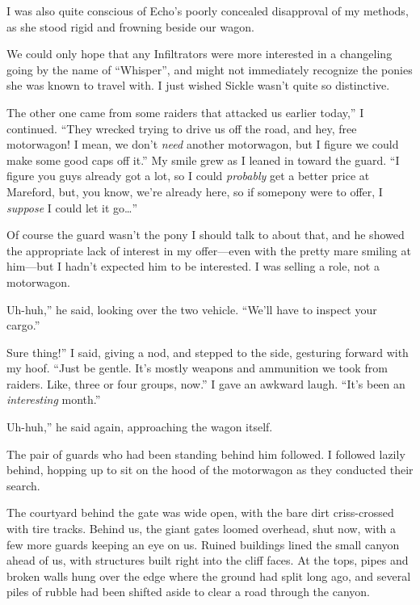 I was also quite conscious of Echo’s poorly concealed disapproval of my methods, as she stood rigid and frowning beside our wagon.

We could only hope that any Infiltrators were more interested in a changeling going by the name of “Whisper”, and might not immediately recognize the ponies she was known to travel with. I just wished Sickle wasn’t quite so distinctive.

\leavevmode{}The other one came from some raiders that attacked us earlier today,” I continued. “They wrecked trying to drive us off the road, and hey, free motorwagon! I mean, we don’t \textit{need} another motorwagon, but I figure we could make some good caps off it.” My smile grew as I leaned in toward the guard. “I figure you guys already got a lot, so I could \textit{probably} get a better price at Mareford, but, you know, we’re already here, so if somepony were to offer, I \textit{suppose} I could let it go…”

Of course the guard wasn’t the pony I should talk to about that, and he showed the appropriate lack of interest in my offer—even with the pretty mare smiling at him—but I hadn’t expected him to be interested. I was selling a role, not a motorwagon.

\leavevmode{}Uh-huh,” he said, looking over the two vehicle. “We’ll have to inspect your cargo.”

\leavevmode{}Sure thing!” I said, giving a nod, and stepped to the side, gesturing forward with my hoof. “Just be gentle. It’s mostly weapons and ammunition we took from raiders. Like, three or four groups, now.” I gave an awkward laugh. “It’s been an \textit{interesting} month.”

\leavevmode{}Uh-huh,” he said again, approaching the wagon itself.

The pair of guards who had been standing behind him followed. I followed lazily behind, hopping up to sit on the hood of the motorwagon as they conducted their search.

The courtyard behind the gate was wide open, with the bare dirt criss-crossed with tire tracks. Behind us, the giant gates loomed overhead, shut now, with a few more guards keeping an eye on us. Ruined buildings lined the small canyon ahead of us, with structures built right into the cliff faces. At the tops, pipes and broken walls hung over the edge where the ground had split long ago, and several piles of rubble had been shifted aside to clear a road through the canyon.

